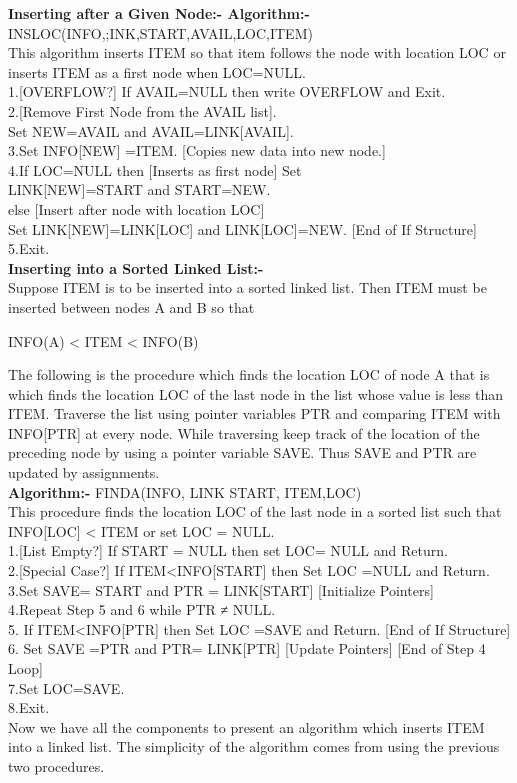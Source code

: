 \documentclass[11pt]{article}            %
\begin{document}
\textbf{Inserting after a Given Node:- Algorithm:-}\\
INSLOC(INFO,;INK,START,AVAIL,LOC,ITEM)\\
This algorithm inserts ITEM so that item follows the node with location LOC or
inserts ITEM as a first node when LOC=NULL.\\
1.[OVERFLOW?] If AVAIL=NULL then write OVERFLOW and Exit.\\
2.[Remove First Node from the AVAIL list].\\
Set NEW=AVAIL and AVAIL=LINK[AVAIL].\\
3.Set INFO[NEW] =ITEM. [Copies new data into new node.]\\
4.If LOC=NULL then [Inserts as first node] Set\\
LINK[NEW]=START and START=NEW.\\
else [Insert after node with location LOC]\\
Set LINK[NEW]=LINK[LOC] and LINK[LOC]=NEW. [End of
If Structure]\\
5.Exit.\\

\textbf{Inserting into a Sorted Linked List:-}\\
Suppose ITEM is to be inserted into a sorted linked list. Then ITEM must be inserted
between nodes A and B so that\\
\begin{center}
INFO(A) < ITEM < INFO(B)
\end{center}
The following is the procedure which finds the location LOC of node A that is which finds the
location LOC of the last node in the list whose value is less than ITEM. Traverse the list using
pointer variables PTR and comparing ITEM with INFO[PTR] at every node. While traversing
keep track of the location of the preceding node by using a pointer variable SAVE. Thus SAVE
and PTR are updated by assignments.\\

\textbf{Algorithm:-}
FINDA(INFO, LINK START, ITEM,LOC)\\
This procedure finds the location LOC of the last node in a sorted list such that
INFO[LOC] < ITEM or set LOC = NULL.\\
1.[List Empty?] If START = NULL then set LOC= NULL and
Return.\\
2.[Special Case?] If ITEM<INFO[START] then Set LOC =NULL and
Return.\\
3.Set SAVE= START and PTR = LINK[START] [Initialize
Pointers]\\
4.Repeat Step 5 and 6 while PTR ≠ NULL.\\
5. If ITEM<INFO[PTR] then
Set LOC =SAVE and Return. [End of If
Structure]\\
6. Set SAVE =PTR and PTR= LINK[PTR] [Update Pointers]
[End of Step 4 Loop]\\
7.Set LOC=SAVE.\\
8.Exit.\\
Now we have all the components to present an algorithm which inserts ITEM into a
linked list. The simplicity of the algorithm comes from using the previous two
procedures.\\
\end{document}
